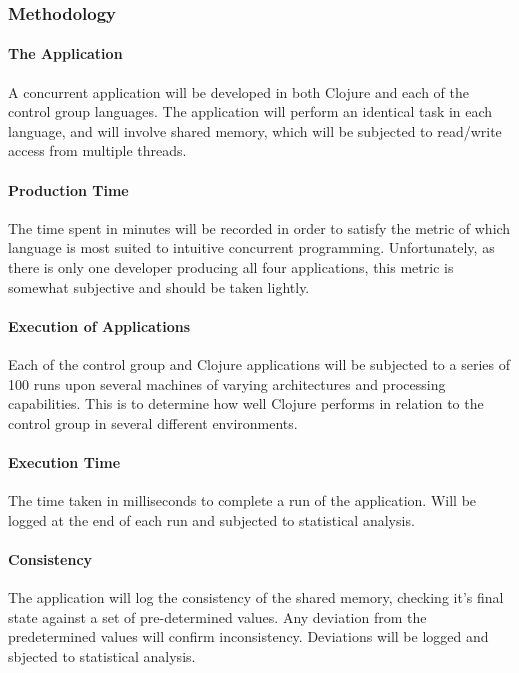 \documentclass[12pt,a4paper]{article}
\begin{document}
\subsubsection{Methodology}

\paragraph{The Application}
A concurrent application will be developed in both Clojure and each of the control group languages. The application will perform an identical task in each language, and will involve shared memory, which will be subjected to read/write access from multiple threads.

\paragraph{Production Time}

The time spent in minutes will be recorded in order to satisfy the metric of which language is most suited to intuitive concurrent programming. Unfortunately, as there is only one developer producing all four applications, this metric is somewhat subjective and should be taken lightly. 

\paragraph{Execution of Applications}
Each of the control group and Clojure applications will be subjected to a series of 100 runs upon several machines of varying architectures and processing capabilities. This is to determine how well Clojure performs in relation to the control group in several different environments. 

\paragraph{Execution Time}
The time taken in milliseconds to complete a run of the application. Will be logged at the end of each run and subjected to statistical analysis.

\paragraph{Consistency}
The application will log the consistency of the shared memory, checking it's final state against a set of pre-determined values. Any deviation from the predetermined values will confirm inconsistency. Deviations will be logged and sbjected to statistical analysis.
\end{document}

